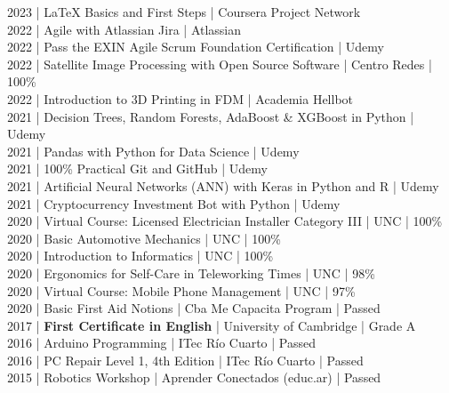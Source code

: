 {2023 | LaTeX Basics and First Steps | Coursera Project Network \\
2022 | Agile with Atlassian Jira | Atlassian \\
2022 | Pass the EXIN Agile Scrum Foundation Certification | Udemy \\
2022 | Satellite Image Processing with Open Source Software | Centro Redes | 100\% \\
2022 | Introduction to 3D Printing in FDM | Academia Hellbot \\
2021 | Decision Trees, Random Forests, AdaBoost \& XGBoost in Python | Udemy \\
2021 | Pandas with Python for Data Science | Udemy \\
2021 | 100\% Practical Git and GitHub | Udemy \\
2021 | Artificial Neural Networks (ANN) with Keras in Python and R | Udemy \\
2021 | Cryptocurrency Investment Bot with Python | Udemy \\
2020 | Virtual Course: Licensed Electrician Installer Category III | UNC | 100\% \\
2020 | Basic Automotive Mechanics | UNC | 100\% \\
2020 | Introduction to Informatics | UNC | 100\% \\
2020 | Ergonomics for Self-Care in Teleworking Times | UNC | 98\% \\
2020 | Virtual Course: Mobile Phone Management | UNC | 97\% \\
2020 | Basic First Aid Notions | Cba Me Capacita Program | Passed \\
2017 | \textbf{First Certificate in English} | University of Cambridge | Grade A \\
2016 | Arduino Programming | ITec Río Cuarto | Passed \\
2016 | PC Repair Level 1, 4th Edition | ITec Río Cuarto | Passed \\
2015 | Robotics Workshop | Aprender Conectados (educ.ar) | Passed \\
}

\vspace{\spacesection}